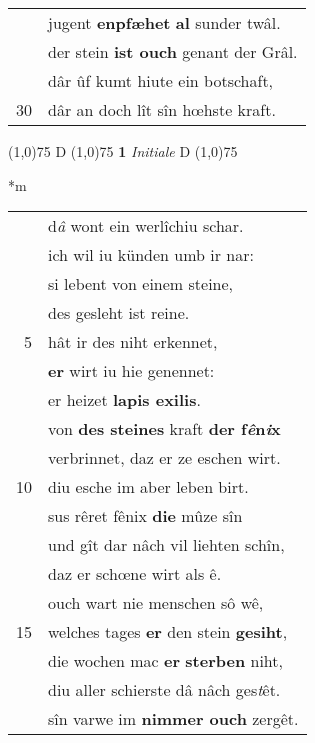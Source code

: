 \documentclass[8pt,a4paper,notitlepage]{article}
\begin{document}
\begin{table}[ht]
\begin{minipage}[t]{0.5\linewidth}
\begin{tabular}{rl}
 & jugent \textbf{enpfæhet} \textbf{al} sunder twâl.\\ 
 & der stein \textbf{ist ouch} genant der Grâl.\\ 
 & dâr ûf kumt hiute ein botschaft,\\ 
30 & dâr an doch lît sîn hœhste kraft.\\ 
\end{tabular}
\scriptsize
\line(1,0){75} \newline
D \newline
\line(1,0){75} \newline
\textbf{1} \textit{Initiale} D  \newline
\line(1,0){75} \newline
\newline
\end{minipage}
\hspace{0.5cm}
\begin{minipage}[t]{0.5\linewidth}
\small
\begin{center}*m
\end{center}
\begin{tabular}{rl}
 & d\textit{â} wont ein werlîchiu schar.\\ 
 & ich wil iu künden umb ir nar:\\ 
 & si lebent von einem steine,\\ 
 & des gesleht ist reine.\\ 
5 & hât ir des niht erkennet,\\ 
 & \textbf{er} wirt iu hie genennet:\\ 
 & er heizet \textbf{lapis exilis}.\\ 
 & von \textbf{des steines} kraft \textbf{der f\textit{ê}n\textit{i}x}\\ 
 & verbrinnet, daz er ze eschen wirt.\\ 
10 & diu esche im aber leben birt.\\ 
 & sus rêret fênix \textbf{die} mûze sîn\\ 
 & und gît dar nâch vil liehten schîn,\\ 
 & daz er schœne wirt als ê.\\ 
 & ouch wart nie menschen sô wê,\\ 
15 & welches tages \textbf{er} den stein \textbf{gesiht},\\ 
 & die wochen mac \textbf{er} \textbf{sterben} niht,\\ 
 & diu aller schierste dâ nâch ges\textit{t}êt.\\ 
 & sîn varwe im \textbf{nimmer ouch} zergêt.\\ 

\end{tabular}
\end{minipage}
\end{table}
\end{document}
